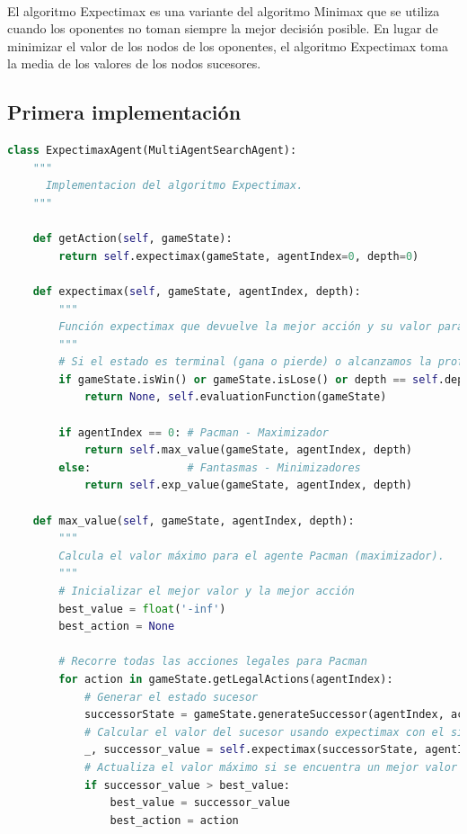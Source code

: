 \documentclass{report}
\begin{document}
          \paragraph*{}{
            El algoritmo Expectimax es una variante del algoritmo Minimax que se utiliza cuando los oponentes no toman siempre la mejor decisión posible.
            En lugar de minimizar el valor de los nodos de los oponentes, el algoritmo Expectimax toma la media de los valores de los nodos sucesores.
          }
        \subsection*{Primera implementación}
          \begin{lstlisting}[language=Python, caption=Implementación inicial del agente Expectimax]
class ExpectimaxAgent(MultiAgentSearchAgent):
    """
      Implementacion del algoritmo Expectimax.
    """

    def getAction(self, gameState):
        return self.expectimax(gameState, agentIndex=0, depth=0)
    
    def expectimax(self, gameState, agentIndex, depth):
        """
        Función expectimax que devuelve la mejor acción y su valor para el agente actual.
        """
        # Si el estado es terminal (gana o pierde) o alcanzamos la profundidad máxima, evaluamos el estado
        if gameState.isWin() or gameState.isLose() or depth == self.depth:
            return None, self.evaluationFunction(gameState)

        if agentIndex == 0: # Pacman - Maximizador
            return self.max_value(gameState, agentIndex, depth)
        else:               # Fantasmas - Minimizadores
            return self.exp_value(gameState, agentIndex, depth)
        
    def max_value(self, gameState, agentIndex, depth):
        """
        Calcula el valor máximo para el agente Pacman (maximizador).
        """
        # Inicializar el mejor valor y la mejor acción
        best_value = float('-inf')
        best_action = None

        # Recorre todas las acciones legales para Pacman
        for action in gameState.getLegalActions(agentIndex):
            # Generar el estado sucesor
            successorState = gameState.generateSuccessor(agentIndex, action)
            # Calcular el valor del sucesor usando expectimax con el siguiente agente
            _, successor_value = self.expectimax(successorState, agentIndex + 1, depth)
            # Actualiza el valor máximo si se encuentra un mejor valor
            if successor_value > best_value:
                best_value = successor_value
                best_action = action


\end{lstlisting}
\end{document}
